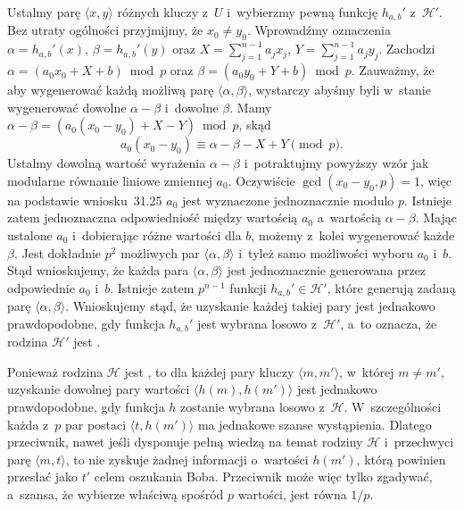 \subproblem %
Ustalmy parę $\langle x,y\rangle$ różnych kluczy z~$U$ i~wybierzmy pewną funkcję $h_{a,b}'$ z~$\mathcal{H}'$.
Bez utraty ogólności przyjmijmy, że $x_0\ne y_0$.
Wprowadźmy oznaczenia $\alpha=h_{a,b}'(x)$, $\beta=h_{a,b}'(y)$ oraz $X=\sum_{j=1}^{n-1}a_jx_j$, $Y=\sum_{j=1}^{n-1}a_jy_j$.
Zachodzi $\alpha=(a_0x_0+X+b)\bmod p$ oraz $\beta=(a_0y_0+Y+b)\bmod p$.
Zauważmy, że aby wygenerować każdą możliwą parę $\langle\alpha,\beta\rangle$, wystarczy abyśmy byli w~stanie wygenerować dowolne $\alpha-\beta$ i~dowolne $\beta$.
Mamy $\alpha-\beta=(a_0(x_0-y_0)+X-Y)\bmod p$, skąd
\[
	a_0(x_0-y_0) \equiv \alpha-\beta-X+Y \pmod p.
\]
Ustalmy dowolną wartość wyrażenia $\alpha-\beta$ i~potraktujmy powyższy wzór jak modularne równanie liniowe zmiennej $a_0$.
Oczywiście $\gcd(x_0-y_0,p)=1$, więc na podstawie wniosku~31.25 $a_0$ jest wyznaczone jednoznacznie modulo $p$.
Istnieje zatem jednoznaczna odpowiedniość między wartością $a_0$ a~wartością $\alpha-\beta$.
Mając ustalone $a_0$ i~dobierając różne wartości dla $b$, możemy z~kolei wygenerować każde $\beta$.
Jest dokładnie $p^2$ możliwych par $\langle\alpha,\beta\rangle$ i~tyleż samo możliwości wyboru $a_0$ i~$b$.
Stąd wnioskujemy, że każda para $\langle\alpha,\beta\rangle$ jest jednoznacznie generowana przez odpowiednie $a_0$ i~$b$.
Istnieje zatem $p^{n-1}$ funkcji $h_{a,b}'\in\mathcal{H}'$, które generują zadaną parę $\langle\alpha,\beta\rangle$.
Wnioskujemy stąd, że uzyskanie każdej takiej pary jest jednakowo prawdopodobne, gdy funkcja $h_{a,b}'$ jest wybrana losowo z~$\mathcal{H}'$, a~to oznacza, że rodzina $\mathcal{H}'$ jest .

\subproblem %
Ponieważ rodzina $\mathcal{H}$ jest , to dla każdej pary kluczy $\langle m,m'\rangle$, w~której $m\ne m'$, uzyskanie dowolnej pary wartości $\langle h(m),h(m')\rangle$ jest jednakowo prawdopodobne, gdy funkcja $h$ zostanie wybrana losowo z~$\mathcal{H}$.
W~szczególności każda z~$p$ par postaci $\langle t,h(m')\rangle$ ma jednakowe szanse wystąpienia.
Dlatego przeciwnik, nawet jeśli dysponuje pełną wiedzą na temat rodziny $\mathcal{H}$ i~przechwyci parę $\langle m,t\rangle$, to nie zyskuje żadnej informacji o~wartości $h(m')$, którą powinien przesłać jako $t'$ celem oszukania Boba.
Przeciwnik może więc tylko zgadywać, a~szansa, że wybierze właściwą spośród $p$ wartości, jest równa $1/p$.

\endinput
